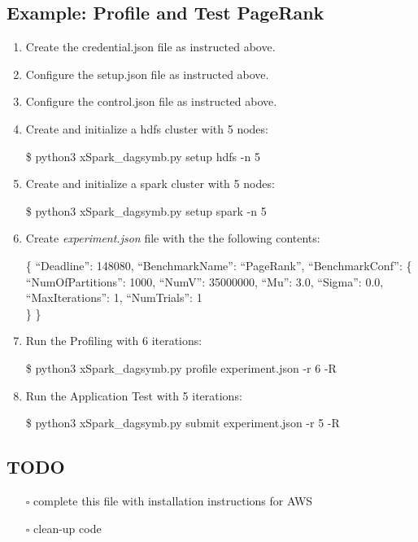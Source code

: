 \hypertarget{example-profile-and-test-pagerank}{%
\subsection{Example: Profile and Test
	PageRank}\label{example-profile-and-test-pagerank}}

\begin{enumerate}
\def\labelenumi{\arabic{enumi})}
\item
Create the credential.json file as instructed above.
\item
Configure the setup.json file as instructed above.
\item
Configure the control.json file as instructed above.
\item
Create and initialize a hdfs cluster with 5 nodes:

\$ python3 xSpark\_dagsymb.py setup hdfs -n 5
\item
Create and initialize a spark cluster with 5 nodes:

\$ python3 xSpark\_dagsymb.py setup spark -n 5
\item
Create \emph{experiment.json} file with the the following contents:

\{ ``Deadline'': 148080, ``BenchmarkName'': ``PageRank'',
``BenchmarkConf'': \{ ``NumOfPartitions'': 1000, ``NumV'': 35000000,
``Mu'': 3.0, ``Sigma'': 0.0, ``MaxIterations'': 1, ``NumTrials'': 1\\
\} \}
\item
Run the Profiling with 6 iterations:

\$ python3 xSpark\_dagsymb.py profile experiment.json -r 6 -R
\item
Run the Application Test with 5 iterations:

\$ python3 xSpark\_dagsymb.py submit experiment.json -r 5 -R
\end{enumerate}

\hypertarget{todo}{%
\subsection{TODO}\label{todo}}

\begin{itemize}
\item[$\square$]
complete this file with installation instructions for AWS
\item[$\square$]
clean-up code
\end{itemize}
